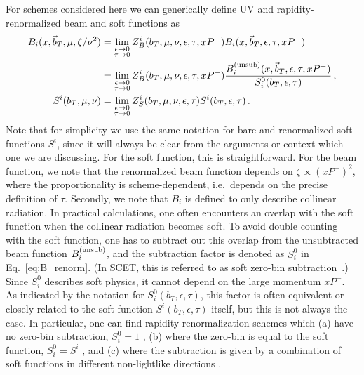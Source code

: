 \documentclass[11pt,a4paper]{article}
\DeclareRobustCommand{\eq}[1]{Eq.~\eqref{eq:#1}}
\newcommand{\eps}{\epsilon}
\newcommand{\nn}{\nonumber}
\newcommand{\bt}{\vec b_T}
\newcommand{\unsub}{{\rm(unsub)}}
\begin{document}
For schemes considered here we can generically define UV and rapidity-renormalized beam and soft functions as
%
\begin{align} \label{eq:B_renorm}
 B_i(x, \bt, \mu, \zeta/\nu^2) &
 = \lim_{\substack{\epsilon\to 0 \\ \tau\to 0}} Z_B^i(b_T, \mu, \nu, \eps, \tau, x P^-) B_i(x, \bt, \eps, \tau, x P^-)
 \nn\\&
 = \lim_{\substack{\epsilon\to 0 \\ \tau\to 0}}Z_B^i(b_T, \mu, \nu, \eps, \tau, x P^-) \frac{B_i^\unsub(x, \bt, \eps, \tau, x P^-)}{S_i^0(b_T, \eps, \tau)}
\,, \\ \label{eq:S_renorm}
 S^i(b_T,\mu,\nu) &= \lim_{\substack{\epsilon\to 0 \\ \tau\to 0}} Z_S^i(b_T, \mu, \nu, \eps, \tau) S^i(b_T,\eps,\tau)
\,.\end{align}
Note that for simplicity we use the same notation for bare and renormalized soft functions $S^i$, since it will always be clear from the arguments or context which one we are discussing.
For the soft function, this is straightforward.
For the beam function, we note that the renormalized beam function depends on $\zeta \propto (x P^-)^2$, where the proportionality is scheme-dependent, i.e.\ depends on the precise definition of $\tau$.
Secondly, we note that $B_i$ is defined to only describe collinear radiation. In practical calculations, one often encounters an overlap with the soft function when the collinear radiation becomes soft.
To avoid double counting with the soft function, one has to subtract out this overlap from the unsubtracted beam function $B_i^\unsub$, and the subtraction factor is denoted as $S_i^0$ in \eq{B_renorm}.
(In SCET, this is referred to as soft zero-bin subtraction~\cite{Manohar:2006nz}.)
Since $S_i^0$ describes soft physics, it cannot depend on the large momentum $x P^-$.
As indicated by the notation for $S_i^0(b_T,\eps,\tau)$, this factor is often equivalent or closely related to the soft function $S^i(b_T,\epsilon,\tau)$ itself, but this is not always the case.
In particular, one can find rapidity renormalization schemes which
(a) have no zero-bin subtraction, $S_i^0 = 1$ \cite{Chiu:2012ir},
(b) where the zero-bin is equal to the soft function, $S_i^0 = S^i$ \cite{GarciaEchevarria:2011rb,Li:2016axz}, and
(c) where the subtraction is given by a combination of soft functions in different non-lightlike directions \cite{Collins:1350496}.
\end{document}
